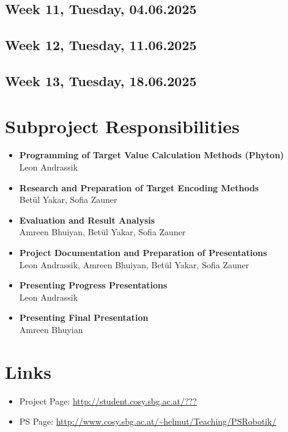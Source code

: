 \documentclass[12pt,fleqn,a4paper]{article}
\begin{document}
\subsection{Week 11, Tuesday, 04.06.2025}

\subsection{Week 12, Tuesday, 11.06.2025}

\subsection{Week 13, Tuesday, 18.06.2025}

\newpage

\section{Subproject Responsibilities} %

\begin{itemize}
\item{\textbf{Programming of Target Value Calculation Methods (Phyton)} \\
 Leon Andrassik }
\item{\textbf{Research and Preparation of Target Encoding Methods} \\
\indent Bet\"ul Yakar, Sofia Zauner}
\item{\textbf{Evaluation and Result Analysis} \\
\indent Amreen Bhuiyan, Bet\"ul Yakar, Sofia Zauner}
\item{\textbf{Project Documentation and Preparation of Presentations} \\
\indent Leon Andrassik, Amreen Bhuiyan, Bet\"ul Yakar, Sofia Zauner }
\item{\textbf{Presenting Progress Presentations} \\
\indent Leon Andrassik }
\item{\textbf{Presenting Final Presentation} \\
\indent Amreen Bhuyian }
\end{itemize}

\newpage

\section{Links}

\begin{itemize}
\item Project Page: \url{http://student.cosy.sbg.ac.at/???}
\item PS Page:
\url{http://www.cosy.sbg.ac.at/~helmut/Teaching/PSRobotik/}

\end{itemize}

\end{document}
